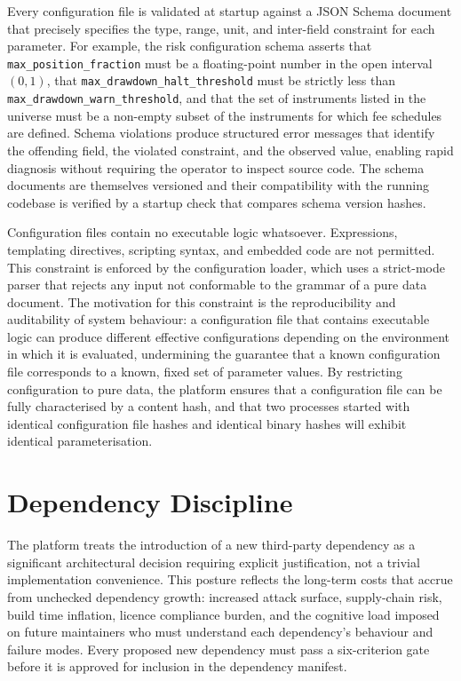 \documentclass[12pt,openany]{book}
\numberwithin{equation}{chapter}
\theoremstyle{plain}
\theoremstyle{definition}
\theoremstyle{remark}
\begin{document}
Every configuration file is validated at startup against a JSON Schema document that precisely specifies the type, range, unit, and inter-field constraint for each parameter. For example, the risk configuration schema asserts that \texttt{max\_position\_fraction} must be a floating-point number in the open interval $(0, 1)$, that \texttt{max\_drawdown\_halt\_threshold} must be strictly less than \texttt{max\_drawdown\_warn\_threshold}, and that the set of instruments listed in the universe must be a non-empty subset of the instruments for which fee schedules are defined. Schema violations produce structured error messages that identify the offending field, the violated constraint, and the observed value, enabling rapid diagnosis without requiring the operator to inspect source code. The schema documents are themselves versioned and their compatibility with the running codebase is verified by a startup check that compares schema version hashes.

Configuration files contain no executable logic whatsoever. Expressions, templating directives, scripting syntax, and embedded code are not permitted. This constraint is enforced by the configuration loader, which uses a strict-mode parser that rejects any input not conformable to the grammar of a pure data document. The motivation for this constraint is the reproducibility and auditability of system behaviour: a configuration file that contains executable logic can produce different effective configurations depending on the environment in which it is evaluated, undermining the guarantee that a known configuration file corresponds to a known, fixed set of parameter values. By restricting configuration to pure data, the platform ensures that a configuration file can be fully characterised by a content hash, and that two processes started with identical configuration file hashes and identical binary hashes will exhibit identical parameterisation.

\section{Dependency Discipline}

The platform treats the introduction of a new third-party dependency as a significant architectural decision requiring explicit justification, not a trivial implementation convenience. This posture reflects the long-term costs that accrue from unchecked dependency growth: increased attack surface, supply-chain risk, build time inflation, licence compliance burden, and the cognitive load imposed on future maintainers who must understand each dependency's behaviour and failure modes. Every proposed new dependency must pass a six-criterion gate before it is approved for inclusion in the dependency manifest.
\end{document}
